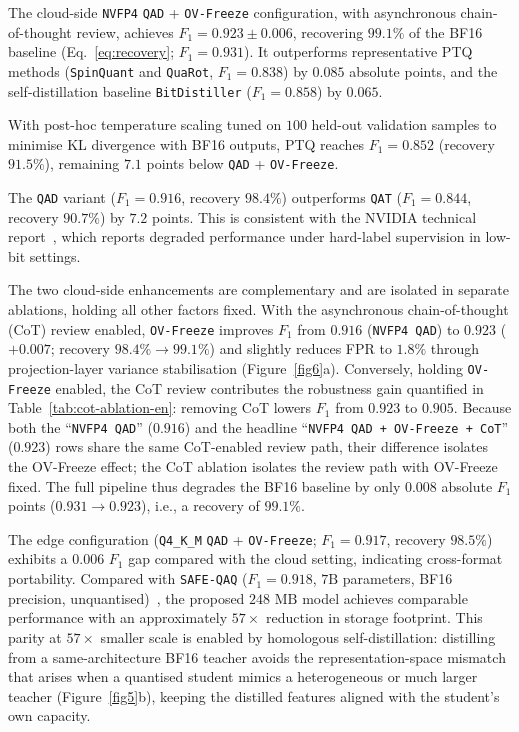\documentclass[a4paper,fleqn]{cas-sc}
\begin{document}
The cloud-side \texttt{NVFP4} \texttt{QAD} + \texttt{OV-Freeze} configuration, with asynchronous chain-of-thought review, achieves $F_1 = 0.923 \pm 0.006$, recovering $99.1\%$ of the BF16 baseline (Eq.~\eqref{eq:recovery}; $F_1 = 0.931$). It outperforms representative PTQ methods (\texttt{SpinQuant} and \texttt{QuaRot}, $F_1 = 0.838$) by $0.085$ absolute points, and the self-distillation baseline \texttt{BitDistiller} ($F_1 = 0.858$) by $0.065$.

With post-hoc temperature scaling tuned on $100$ held-out validation samples to minimise KL divergence with BF16 outputs, PTQ reaches $F_1 = 0.852$ (recovery $91.5\%$), remaining $7.1$ points below \texttt{QAD} + \texttt{OV-Freeze}.

The \texttt{QAD} variant ($F_1 = 0.916$, recovery $98.4\%$) outperforms \texttt{QAT} ($F_1 = 0.844$, recovery $90.7\%$) by $7.2$ points. This is consistent with the NVIDIA technical report~\citep{3}, which reports degraded performance under hard-label supervision in low-bit settings.

The two cloud-side enhancements are complementary and are isolated in separate ablations, holding all other factors fixed. With the asynchronous chain-of-thought (CoT) review enabled, \texttt{OV-Freeze} improves $F_1$ from $0.916$ (\texttt{NVFP4 QAD}) to $0.923$ ($+0.007$; recovery $98.4\%\rightarrow99.1\%$) and slightly reduces FPR to $1.8\%$ through projection-layer variance stabilisation (Figure~\ref{fig6}a). Conversely, holding \texttt{OV-Freeze} enabled, the CoT review contributes the robustness gain quantified in Table~\ref{tab:cot-ablation-en}: removing CoT lowers $F_1$ from $0.923$ to $0.905$. Because both the ``\texttt{NVFP4 QAD}'' ($0.916$) and the headline ``\texttt{NVFP4 QAD + OV-Freeze + CoT}'' ($0.923$) rows share the same CoT-enabled review path, their difference isolates the OV-Freeze effect; the CoT ablation isolates the review path with OV-Freeze fixed.
The full pipeline thus degrades the BF16 baseline by only $0.008$ absolute $F_1$ points ($0.931 \rightarrow 0.923$), i.e., a recovery of $99.1\%$.

The edge configuration (\texttt{Q4\_K\_M} \texttt{QAD} + \texttt{OV-Freeze}; $F_1 = 0.917$, recovery $98.5\%$) exhibits a $0.006$ $F_1$ gap compared with the cloud setting, indicating cross-format portability. Compared with \texttt{SAFE-QAQ} ($F_1 = 0.918$, $7\text{B}$ parameters, BF16 precision, unquantised)~\citep{2}, the proposed $248\text{~MB}$ model achieves comparable performance with an approximately $57\times$ reduction in storage footprint. This parity at $57\times$ smaller scale is enabled by homologous self-distillation: distilling from a same-architecture BF16 teacher avoids the representation-space mismatch that arises when a quantised student mimics a heterogeneous or much larger teacher (Figure~\ref{fig5}b), keeping the distilled features aligned with the student's own capacity.
\end{document}
